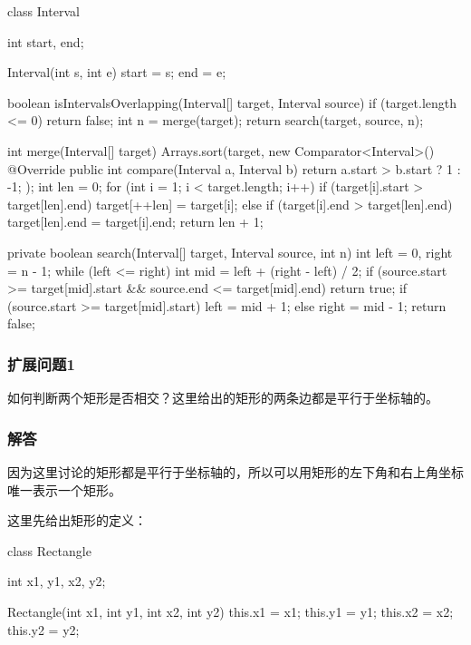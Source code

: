 \begin{Codex}[label={[$O(nlgn)+O(1)$]Chap02_19_IntervalsOverlapping.java}]
	class Interval {
		int start, end;
		
		Interval(int s, int e) {
			start = s;
			end = e;
		}
	}
	
	boolean isIntervalsOverlapping(Interval[] target, Interval source) {
		if (target.length <= 0) {
			return false;
		}
		int n = merge(target);
		return search(target, source, n);
	}
	
	int merge(Interval[] target) {
		Arrays.sort(target, new Comparator<Interval>() {
			@Override
			public int compare(Interval a, Interval b) {
				return a.start > b.start ? 1 : -1;
			}
		});
		int len = 0;
		for (int i = 1; i < target.length; i++) {
			if (target[i].start > target[len].end) {
				target[++len] = target[i];
			} else if (target[i].end > target[len].end) {
			target[len].end = target[i].end;
		}
	}
	return len + 1;
}

private boolean search(Interval[] target, Interval source, int n) {
	int left = 0, right = n - 1;
	while (left <= right) {
		int mid = left + (right - left) / 2;
		if (source.start >= target[mid].start && source.end <= target[mid].end) {
			return true;
		}
		if (source.start >= target[mid].start) {
			left = mid + 1;
		} else {
		right = mid - 1;
	}
}
return false;
}
\end{Codex}

\subsubsection{扩展问题1}
如何判断两个矩形是否相交？这里给出的矩形的两条边都是平行于坐标轴的。

\subsubsection{解答}
因为这里讨论的矩形都是平行于坐标轴的，所以可以用矩形的左下角和右上角坐标唯一表示一个矩形。
\begin{center}
	\label{fig:rectangle-overlapping-1}
\end{center}

这里先给出矩形的定义：
\begin{Codex}[label={Rectangle.java}]
	class Rectangle {
		int x1, y1, x2, y2;
		
		Rectangle(int x1, int y1, int x2, int y2) {
			this.x1 = x1;
			this.y1 = y1;
			this.x2 = x2;
			this.y2 = y2;
		}
	}
\end{Codex}

